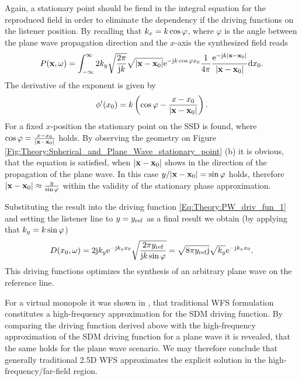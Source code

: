Again, a stationary point should be fiend in the integral equation for the reproduced field in order to eliminate the dependency if the driving functions on the listener position. By recalling that $k_x = k \cos\varphi$, where $\varphi$ is the angle between the plane wave propagation direction and the $x$-axis the synthesized field reads
\begin{equation}
P(\mathbf{x},\omega) = \int_{-\infty}^{\infty} 2 k_y \sqrt{\frac{2\pi}{ \mathrm{j} k }} \sqrt{|\mathbf{x} - \mathbf{x}_0|}\mathrm{e}^{-\mathrm{j}  k \cos\varphi x_0} \frac{1}{4\pi}\frac{\mathrm{e}^{ -\mathrm{j} k | \mathbf{x} -\mathbf{x}_0 | }}{| \mathbf{x} -\mathbf{x}_0 |} \mathrm{d} x_0.
\end{equation}	
The derivative of the exponent is given by
\begin{equation}
\phi'(x_0) = k \left( \cos\varphi - \frac{x-x_0}{|\mathbf{x} - \mathbf{x}_0|} \right).
\end{equation}
For a fixed $x$-position the stationary point on the SSD is found, where $\cos\varphi = \frac{x-x_0}{|\mathbf{x}-\mathbf{x}_0|}$ holds. By observing the geometry on Figure \ref{Fig:Theory:Spherical_and_Plane_Wave_stationary_point} (b) it is obvious, that the equation is satisfied, when $|\mathbf{x}-\mathbf{x}_0|$ shows in the direction of the propagation of the plane wave. 
In this case $y/|\mathbf{x}-\mathbf{x}_0| = \sin\varphi$ holds, therefore $|\mathbf{x} - \mathbf{x}_0| \approx \frac{y}{\sin\varphi}$ within the validity of the stationary phase approximation. 

Substituting the result into the driving function \eqref{Eq:Theory:PW_driv_fun_1} and setting the listener line to $y = y_{\mathrm{ref}}$ as a final result we obtain (by applying that $k_y = k \sin\varphi$)
\begin{equation}
D(x_0,\omega) = 2 \mathrm{j} k_y \mathrm{e}^{-\mathrm{j}  k_x x_0} \sqrt{\frac{2\pi y_{\mathrm{ref}}}{ \mathrm{j} k \sin\varphi }} = \sqrt{8\pi y_{\mathrm{ref}} \mathrm{j}} \sqrt{k_y} \mathrm{e}^{-\mathrm{j}  k_x x_0}.
\label{Eq:Theory:Trad_pw_driv_fun}
\end{equation}
This driving functions optimizes the synthesis of an arbitrary plane wave on the reference line.

For a virtual monopole it was shown in \cite{Spors2010:analysis_and_improvement}, that traditional WFS formulation constitutes a high-frequency approximation for the SDM driving function. By comparing the driving function derived above with the high-frequency approximation of the SDM driving function for a plane wave \cite[Eq.~3.105]{Ahrens2012} it is revealed, that the same holds for the plane wave scenario. We may therefore conclude that generally traditional 2.5D WFS approximates the explicit solution in the high-frequency/far-field region.


